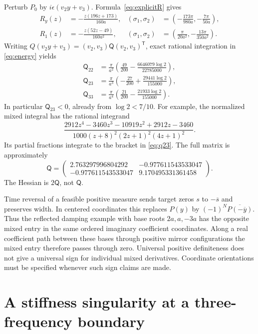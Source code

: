 \documentclass[11pt]{article}
\theoremstyle{remark}\newtheorem{remark}[theorem]{Remark}
\begin{document}
Perturb $P_0$ by $i\epsilon(v_2y+v_3)$. Formula~\eqref{eq:explicitR}
gives
\begin{align*}
 R_y(z)&=-\frac{z(196z+173)}{160a},&
 (\sigma_1,\sigma_2)&=
 \left(-\frac{173\pi}{980a},-\frac{7\pi}{50a}\right),\\
 R_1(z)&=-\frac{z(52z-49)}{160a^2},&
 (\sigma_1,\sigma_2)&=
 \left(\frac{\pi}{20a^2},-\frac{13\pi}{350a^2}\right).
\end{align*}
Writing $Q(v_2y+v_3)=(v_2,v_3)\mathsf Q(v_2,v_3)^{\mathsf T}$, exact
rational integration in \eqref{eq:energy} yields
\begin{align}
 \mathsf Q_{22}&=\frac\pi{a^2}
 \left(\frac{49}{200}-\frac{6646079\log2}{22785000}\right),\label{eq:q22}\\
 \mathsf Q_{23}&=\frac\pi{a^3}
 \left(-\frac{27}{200}+\frac{29441\log2}{155000}\right),\label{eq:q23}\\
 \mathsf Q_{33}&=\frac\pi{a^4}
 \left(\frac{21}{200}-\frac{21933\log2}{155000}\right).\label{eq:q33}
\end{align}
In particular $\mathsf Q_{23}<0$, already from $\log2<7/10$.
For example, the normalized mixed integral has the rational integrand
\[
 \frac{2912z^4-3460z^3-10919z^2+2912z-3460}
 {1000(z+8)^2(2z+1)^2(4z+1)^2}.
\]
Its partial fractions integrate to the bracket in \eqref{eq:q23}.
The full matrix is approximately
\[
 \mathsf Q=
 \begin{pmatrix}
 2.763297996804292&-0.977611543533047\\
 -0.977611543533047&9.170495331361458
 \end{pmatrix}.
\]
The Hessian is $2\mathsf Q$, not $\mathsf Q$.

Time reversal of a feasible positive measure sends target zeros $s$ to
$-\overline s$ and preserves width. In centered coordinates this replaces
$P(y)$ by $(-1)^N\overline{P(-\overline y)}$. Thus the reflected damping
example with base roots $2a,a,-3a$ has the opposite mixed entry in the same
ordered imaginary coefficient coordinates. Along a real coefficient path
between these bases through positive mirror configurations the mixed entry
therefore passes through zero. Universal positive definiteness does not
give a universal sign for individual mixed derivatives. Coordinate
orientations must be specified whenever such sign claims are made.

\section{A stiffness singularity at a three-frequency boundary}
\end{document}
